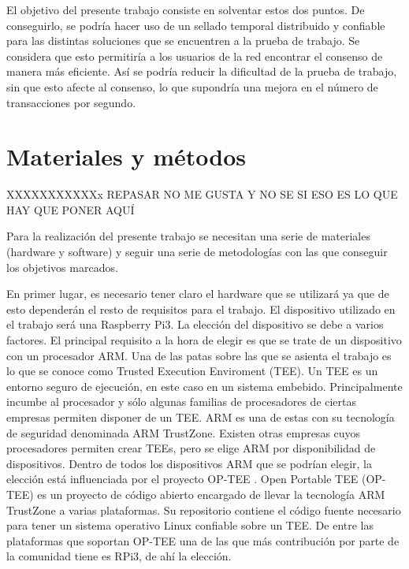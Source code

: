 El objetivo del presente trabajo consiste en solventar estos dos puntos. De conseguirlo, se podría hacer uso de un sellado temporal distribuido y confiable para las distintas soluciones que se encuentren a la prueba de trabajo. Se considera que esto permitiría a los usuarios de la red encontrar el consenso de manera más eficiente. Así se podría reducir la dificultad de la prueba de trabajo, sin que esto afecte al consenso, lo que supondría una mejora en el número de transacciones por segundo.


\section{Materiales y métodos}
XXXXXXXXXXXx REPASAR NO ME GUSTA Y NO SE SI ESO ES LO QUE HAY QUE PONER AQUÍ \newline

Para la realización del presente trabajo se necesitan una serie de materiales (hardware y software) y seguir una serie de metodologías con las que conseguir los objetivos marcados. \newline

En primer lugar, es necesario tener claro el hardware que se utilizará ya que de esto dependerán el resto de requisitos para el trabajo. El dispositivo utilizado en el trabajo será una Raspberry Pi3. La elección del dispositivo se debe a varios factores. El principal requisito a la hora de elegir es que se trate de un dispositivo con un procesador ARM. Una de las patas sobre las que se asienta el trabajo es lo que se conoce como Trusted Execution Enviroment (TEE). Un TEE es un entorno seguro de ejecución, en este caso en un sistema embebido. Principalmente incumbe al procesador y sólo algunas familias de procesadores de ciertas empresas permiten disponer de un TEE. ARM es una de estas con su tecnología de seguridad denominada ARM TrustZone. Existen otras empresas cuyos procesadores permiten crear TEEs, pero se elige ARM por disponibilidad de dispositivos. Dentro de todos los dispositivos ARM que se podrían elegir, la elección está influenciada por el proyecto OP-TEE \cite{optee}. Open Portable TEE (OP-TEE) es un proyecto de código abierto encargado de llevar la tecnología ARM TrustZone a varias plataformas. Su repositorio contiene el código fuente necesario para tener un sistema operativo Linux confiable sobre un TEE. De entre las plataformas que soportan OP-TEE una de las que más contribución por parte de la comunidad tiene es RPi3, de ahí la elección. \newline

